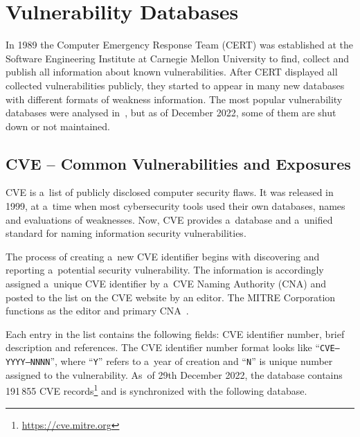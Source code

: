 
  \section{Vulnerability Databases}
  In 1989 the Computer Emergency Response Team (CERT) was established at the Software Engineering Institute
  at Carnegie Mellon University to find, collect and publish all information about known vulnerabilities.
  After CERT displayed all collected vulnerabilities publicly, they started to appear in many new databases
  with different formats of weakness information. The most popular vulnerability databases were analysed
  in~\cite{VulnDBs}, but as of December 2022, some of them are shut down or not maintained.

  \subsection*{CVE -- Common Vulnerabilities and Exposures}
    CVE is a~list of publicly disclosed computer security flaws. It was released in 1999, at a~time when
    most cybersecurity tools used their own databases, names and evaluations of weaknesses. Now, CVE provides
    a~database and a~unified standard for naming information security vulnerabilities.

    The process of creating a~new CVE identifier begins with discovering and reporting a~potential security
    vulnerability. The information is accordingly assigned a~unique CVE identifier by a~CVE Naming Authority
    (CNA) and posted to the list on the CVE website by an editor. The MITRE Corporation functions as the editor
    and primary CNA~\cite{CVE}.

    Each entry in the list contains the following fields: CVE identifier number, brief description and references.
    The CVE identifier number format looks like ``\texttt{CVE--YYYY--NNNN}'', where
    ``\texttt{Y}'' refers to a~year of creation and ``\texttt{N}'' is unique number assigned to the vulnerability.
    As~of 29th December 2022, the database contains 191\,855 CVE records\footnote{\href{https://cve.mitre.org}
    {https://cve.mitre.org}} and is synchronized with the following database.

